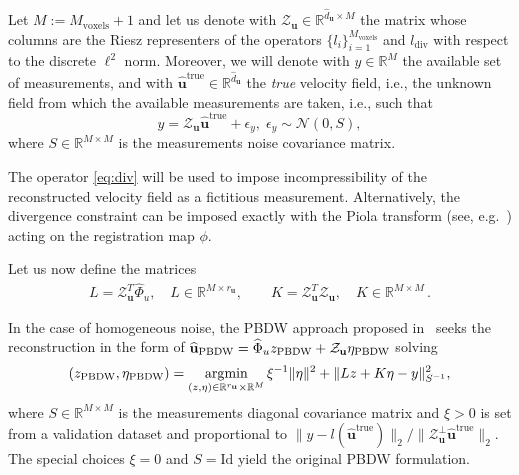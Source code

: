 Let $M := M_{\text{voxels}}+1$ and let us denote with $\mathcal{Z}_{\mathbf u}\in\mathbb{R}^{\widehat{d}_{\mathbf u}\times M}$ the matrix whose columns are the Riesz representers of 
the operators $\{l_i\}_{i=1}^{M_{\text{voxels}}}$ and $ l_{\text{div}}$ with respect to the discrete $\ell^2$ norm.
Moreover, we will denote with 
$y \in \mathbb R^M$ the available set of measurements, and  with $\widehat{\mathbf u}^{\text{true}}\in\mathbb{R}^{\widehat{d}_{\mathbf u}}$ the \textit{true} velocity field, i.e., the unknown field
from which the available measurements are taken, i.e., such that
\begin{equation*}\label{eq:noisy_y}
y = \mathcal{Z}_{\mathbf u} \widehat{\mathbf u}^{\text{true}} + \epsilon_{y},\;\epsilon_y\sim\mathcal{N}(0, S),
\end{equation*}
where $S\in\mathbb{R}^{M\times M}$ is the measurements noise covariance matrix.
 
\begin{rmk}
The operator \eqref{eq:div} will be used to impose incompressibility of the reconstructed velocity field as a fictitious measurement.
Alternatively, the divergence constraint can be imposed exactly with the Piola transform (see, e.g.~\cite{guibert2014group}) acting on the registration map $\phi$.
\end{rmk}

Let us now define the matrices
%
\begin{align*}
  L=\mathcal{Z}_{\mathbf u}^T\widehat{\Phi}_{u},\quad L\in\mathbb{R}^{ M\times r_{\mathbf u}},\qquad K=\mathcal{Z}_{\mathbf u}^T\mathcal{Z}_{\mathbf u},\quad K\in\mathbb{R}^{ M\times  M}\,.
\end{align*}

In the case of homogeneous noise, the PBDW approach proposed in~\cite{gong2019pbdw} seeks the reconstruction 
in the form of $\widehat{\mathbf u}_{\rm PBDW} = \widehat{\Phi}_{u} z_{\rm PBDW} +  \mathcal{Z}_{\mathbf u} \eta_{\rm PBDW}$ solving
  \begin{equation*}
    \label{eq:pbdw_homo}
    (z_{\text{PBDW}}, \eta_{\text{PBDW}}) = \operatorname*{\arg\!\min}_{(z, \eta)\in\mathbb{R}^{r_{\mathbf u}}\times \mathbb{R}^M}\xi^{-1} \lVert\eta\rVert^2+\lVert Lz + K\eta-y\rVert^{2}_{S^{-1}},
  \end{equation*}
where $S\in\mathbb{R}^{M\times M}$ is the measurements diagonal covariance matrix and $\xi >0$ is set from a validation dataset and proportional to 
$\lVert y-l(\widehat{\mathbf u}^{\text{true}})\rVert_2/\lVert\mathcal{Z}_{\mathbf u}^{\perp}\widehat{\mathbf u}^{\text{true}}\rVert_2$. The special choices
$\xi=0$ and $S=\text{Id}$ yield the original PBDW formulation.

